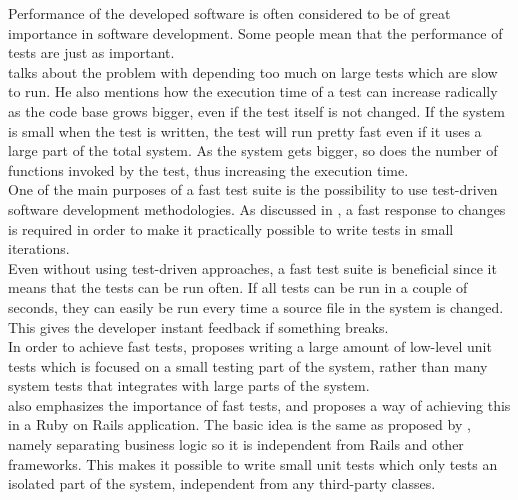
Performance of the developed software is often considered to be of great
importance in software development. Some people mean that the
performance of tests are just as important.\\

\citet{video:fast_slow_test} talks about the problem with depending too
much on large tests which are slow to run. He also mentions how the
execution time of a test can increase radically as the code base grows
bigger, even if the test itself is not changed. If the system is small
when the test is written, the test will run pretty fast even if it uses
a large part of the total system. As the system gets bigger, so does the
number of functions invoked by the test, thus increasing the execution
time.\\

One of the main purposes of a fast test suite is the possibility to use
test-driven software development methodologies. As discussed in
, a fast response to changes is required in order to make
it practically possible to write tests in small iterations.\\

Even without using test-driven approaches, a fast test suite is
beneficial since it means that the tests can be run often. If all tests
can be run in a couple of seconds, they can easily be run every time a
source file in the system is changed. This gives the developer instant
feedback if something breaks.\\

In order to achieve fast tests, \citeauthor{video:fast_slow_test}
proposes writing a large amount of low-level unit tests which is focused
on a small testing part of the system, rather than many system tests
that integrates with large parts of the system.\\

\citet{video:fast_rails_tests} also emphasizes the importance of fast
tests, and proposes a way of achieving this in a Ruby on Rails
application. The basic idea is the same as proposed by
\citeauthor{video:fast_slow_test}, namely separating business logic so
it is independent from Rails and other frameworks. This makes it
possible to write small unit tests which only tests an isolated part of
the system, independent from any third-party classes.\\
